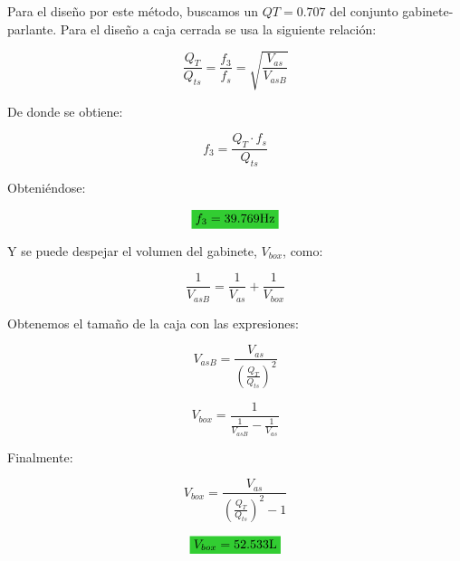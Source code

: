 
\normalfont

Para el diseño por este método, buscamos un $QT = 0.707$ del conjunto gabinete-parlante. Para el diseño a caja cerrada se usa la siguiente relación:

\begin{equation*}
\frac{Q_{T}}{Q_{ts}} = \frac{f_{3}}{f_{s}} = \sqrt{\frac{V_{as}}{V_{asB}}}
\end{equation*}

De donde se obtiene:

\begin{equation}
\boxed{ f_{3} = \frac{Q_{T} \cdot f_{s} }{Q_{ts}} }
\end{equation}

Obteniéndose:

\begin{equation*}
\mathcolorbox{EQColor}{ f_{3} = 39.769 \si[per-mode=symbol]{\hertz} }
\end{equation*}



Y se puede despejar el volumen del gabinete, $V_{box}$, como:

\begin{equation*}
\frac{1}{V_{asB}} = \frac{1}{V_{as}} + \frac{1}{V_{box}}
\end{equation*}


Obtenemos el tamaño de la caja con las expresiones:

\begin{equation*}
V_{asB} = \frac{V_{as}}{ \left( \frac{Q_{T}}{Q_{ts}} \right)^2 }
\end{equation*}

\begin{equation*}
V_{box} = \frac{1}{\frac{1}{V_{asB}} - \frac{1}{V_{as}}}
\end{equation*}

Finalmente:

\begin{equation}
\boxed{ V_{box} = \frac{V_{as}}{ \left( \frac{Q_{T}}{Q_{ts}} \right)^2 - 1} }
\end{equation}


\begin{equation*}
\mathcolorbox{EQColor}{ V_{box} = 52.533 \si[per-mode=symbol]{\liter} }
\end{equation*}





 
